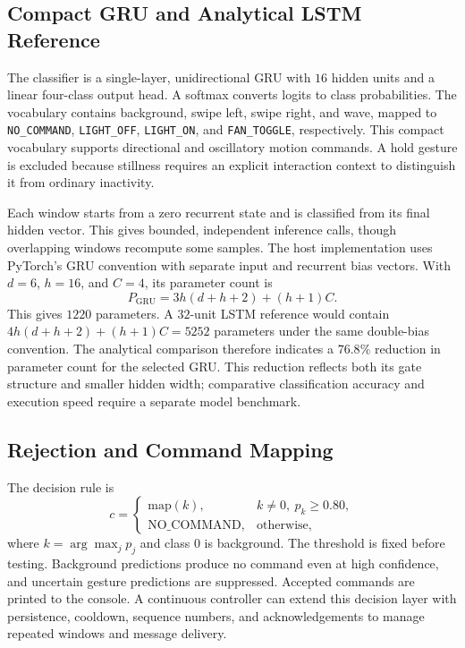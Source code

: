 \documentclass[conference]{IEEEtran}
\begin{document}
\subsection{Compact GRU and Analytical LSTM Reference}
The classifier is a single-layer, unidirectional GRU with $16$ hidden units and a linear four-class output head. A softmax converts logits to class probabilities. The vocabulary contains background, swipe left, swipe right, and wave, mapped to \texttt{NO\_COMMAND}, \texttt{LIGHT\_OFF}, \texttt{LIGHT\_ON}, and \texttt{FAN\_TOGGLE}, respectively. This compact vocabulary supports directional and oscillatory motion commands. A hold gesture is excluded because stillness requires an explicit interaction context to distinguish it from ordinary inactivity.

Each window starts from a zero recurrent state and is classified from its final hidden vector. This gives bounded, independent inference calls, though overlapping windows recompute some samples. The host implementation uses PyTorch's GRU convention with separate input and recurrent bias vectors. With $d=6$, $h=16$, and $C=4$, its parameter count is
\begin{equation}
P_{\mathrm{GRU}}=3h(d+h+2)+(h+1)C.
\end{equation}
This gives $1220$ parameters. A $32$-unit LSTM reference would contain $4h(d+h+2)+(h+1)C=5252$ parameters under the same double-bias convention. The analytical comparison therefore indicates a $76.8\%$ reduction in parameter count for the selected GRU. This reduction reflects both its gate structure and smaller hidden width; comparative classification accuracy and execution speed require a separate model benchmark.

\subsection{Rejection and Command Mapping}
The decision rule is
\begin{equation}
c=\begin{cases}
\mathrm{map}(k),& k\ne0,\ p_k\ge0.80,\\
\mathrm{NO\_COMMAND},&\text{otherwise},
\end{cases}
\end{equation}
where $k=\arg\max_j p_j$ and class $0$ is background. The threshold is fixed before testing. Background predictions produce no command even at high confidence, and uncertain gesture predictions are suppressed. Accepted commands are printed to the console. A continuous controller can extend this decision layer with persistence, cooldown, sequence numbers, and acknowledgements to manage repeated windows and message delivery.
\end{document}
